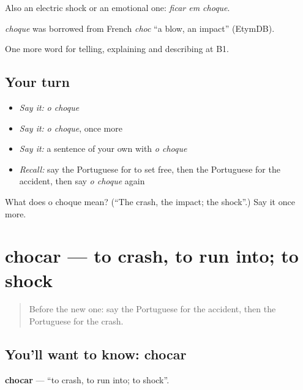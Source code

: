 Also an electric shock or an emotional one: \emph{ficar em choque}.

\begin{cousinweb}
\emph{choque} was borrowed from French \emph{choc} \textquotedblleft{}a blow, an impact\textquotedblright{} (EtymDB).
\end{cousinweb}

\begin{grammarlens}[title={What you've built}]
One more word for telling, explaining and describing at B1.
\end{grammarlens}

\subsection*{Your turn}
\begin{itemize}
\raggedright
  \item \emph{Say it:} \emph{o choque}
  \item \emph{Say it:} \emph{o choque}, once more
  \item \emph{Say it:} a sentence of your own with \emph{o choque}
  \item \emph{Recall:} say the Portuguese for to set free, then the Portuguese for the accident, then say \emph{o choque} again
\end{itemize}

\begin{tcolorbox}[breakable,colback=teal!4,colframe=teal!35!black,title={Before you move on}]
What does o choque mean? (\textquotedblleft{}The crash, the impact; the shock\textquotedblright{}.) Say it once more.
\end{tcolorbox}
\section[chocar]{chocar — to crash, to run into; to shock}

\label{lesson:PT-C299-chocar}



\begin{quote}
Before the new one: say the Portuguese for the accident, then the Portuguese for the crash.
\end{quote}

\subsection*{You'll want to know: chocar}
\textbf{chocar} — \textquotedblleft{}to crash, to run into; to shock\textquotedblright{}.

